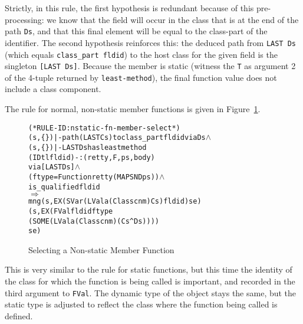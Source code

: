 \documentclass[11pt]{article}
\newcommand{\lbr}{\texttt{\{}}
\newcommand{\rbr}{\texttt{\}}}
\begin{document}
%
Strictly, in this rule, the first hypothesis is redundant because of
this pre-processing: we know that the field will occur in the class
that is at the end of the path \texttt{Ds}, and that this final
element will be equal to the class-part of the identifier.  The second
hypothesis reinforces this: the deduced path from \texttt{LAST~Ds}
(which equals \texttt{class_part~fldid}) to the host class for the
given field is the singleton \texttt{[LAST~Ds]}.  Because the member
is static (witness the \texttt{T} as argument 2 of the 4-tuple
returned by \texttt{least-method}), the final function value does not
include a class component.

The rule for normal, non-static  member functions is given in
Figure~\ref{fig:nstatic-fn-member-select}.
\begin{figure}
\begin{center}
\begin{minipage}{\textwidth}
%
\begin{alltt}
(* RULE-ID: nstatic-fn-member-select *)
     (s,\lbr\rbr) |- path (LAST Cs) to class_part fldid via Ds \(\land\)
     (s,\lbr\rbr) |- LAST Ds has least method
                  (IDtl fldid) -: (retty,F,ps,body)
                  via [LAST Ds] \(\land\)
     (ftype = Function retty (MAP SND ps)) \(\land\)
     is_qualified fldid
   \(\Rightarrow\)
     mng (s, EX (SVar (LVal a (Class cnm) Cs) fldid) se)
         (s, EX (FVal fldid ftype
                      (SOME (LVal a (Class cnm) (Cs ^ Ds))))
                se)
\end{alltt}
\end{minipage}
\end{center}
\caption{Selecting a Non-static Member Function}
\label{fig:nstatic-fn-member-select}
\end{figure}
This is very similar to the rule for static functions, but this time
the identity of the class for which the function is being called is
important, and recorded in the third argument to \texttt{FVal}.  The
dynamic type of the object stays the same, but the static type is
adjusted to reflect the class where the function being called is
defined.
\end{document}
